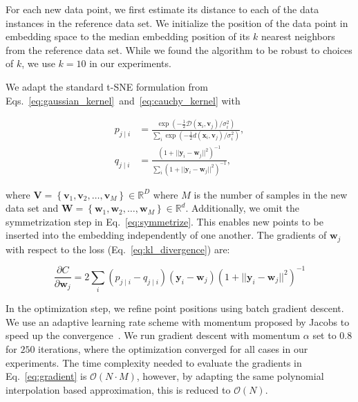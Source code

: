 \documentclass[runningheads]{llncs}
\begin{document}
For each new data point, we first estimate its distance to each of the data
instances in the reference data set. We initialize the position of the data
point in embedding space to the median embedding position of its $k$ nearest
neighbors from the reference data set. While we found the algorithm to be
robust to choices of $k$, we use $k=10$ in our experiments.

We adapt the standard t-SNE formulation from
Eqs.~\ref{eq:gaussian_kernel}~and~\ref{eq:cauchy_kernel} with

\begin{align}
p_{j \mid i} &= \frac{\exp \left ( -\frac{1}{2} \mathcal{D}(\mathbf{x}_i, \mathbf{v}_j) / \sigma_i^2 \right )}{\sum_{i} \exp \left ( -\frac{1}{2} d(\mathbf{x}_i, \mathbf{v}_j) / \sigma_i^2 \right )}, \\
q_{j \mid i} &= \frac{\left ( 1 + || \mathbf{y}_i - \mathbf{w}_j ||^2 \right )^{-1}}{\sum_{i}\left ( 1 + || \mathbf{y}_i - \mathbf{w}_j ||^2 \right )^{-1}},
\end{align}

\noindent where $\mathbf{V} = \left \{ \mathbf{v}_1, \mathbf{v}_2, \dots,
\mathbf{v}_M \right \} \in \mathbb{R}^D$ where $M$ is the number of samples in
the new data set and $\mathbf{W} = \left \{ \mathbf{w}_1, \mathbf{w}_2, \dots,
\mathbf{w}_M \right \} \in \mathbb{R}^d$. Additionally, we omit the
symmetrization step in Eq.~\ref{eq:symmetrize}. This enables new points to be
inserted into the embedding independently of one another. The gradients of
$\mathbf{w}_j$ with respect to the loss (Eq.~\ref{eq:kl_divergence}) are:

\begin{equation}
\frac{\partial C}{\partial \mathbf{w}_j} = 2 \sum_i \left ( p_{j \mid i} - q_{j \mid i} \right ) \left ( \mathbf{y}_i - \mathbf{w}_j \right ) \left ( 1 + || \mathbf{y}_i - \mathbf{w}_j || ^2 \right )^{-1}
\label{eq:gradient}
\end{equation}

In the optimization step, we refine point positions using batch gradient
descent. We use an adaptive learning rate scheme with momentum proposed by
Jacobs to speed up the convergence~\cite{momentum}. We run gradient descent
with momentum $\alpha$ set to $0.8$ for $250$ iterations, where the
optimization converged for all cases in our experiments.  The time complexity
needed to evaluate the gradients in Eq.~\ref{eq:gradient} is $\mathcal{O}(N
\cdot M)$, however, by adapting the same polynomial interpolation based
approximation, this is reduced to $\mathcal{O}(N)$.
\end{document}
